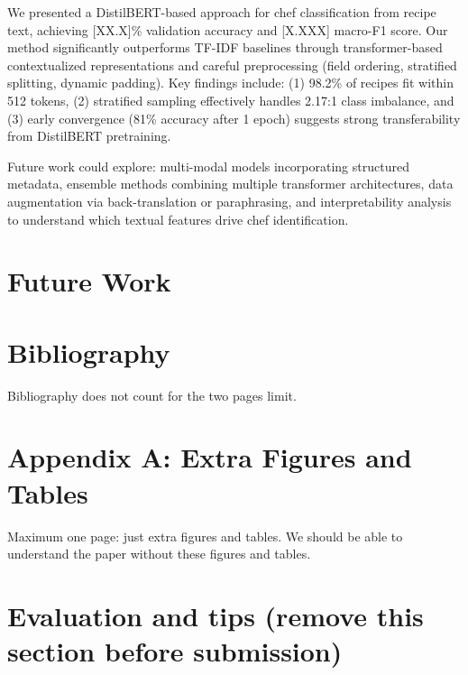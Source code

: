 \documentclass[twocolumn,10pt]{article}
\begin{document}
We presented a DistilBERT-based approach for chef classification from recipe text, achieving [XX.X]\% validation accuracy and [X.XXX] macro-F1 score. Our method significantly outperforms TF-IDF baselines through transformer-based contextualized representations and careful preprocessing (field ordering, stratified splitting, dynamic padding). Key findings include: (1) 98.2\% of recipes fit within 512 tokens, (2) stratified sampling effectively handles 2.17:1 class imbalance, and (3) early convergence (81\% accuracy after 1 epoch) suggests strong transferability from DistilBERT pretraining.

Future work could explore: multi-modal models incorporating structured metadata, ensemble methods combining multiple transformer architectures, data augmentation via back-translation or paraphrasing, and interpretability analysis to understand which textual features drive chef identification.

\section{Future Work}

\section*{Bibliography}



Bibliography does not count for the two pages limit.


\appendix

\section*{Appendix A: Extra Figures and Tables}

Maximum one page: just extra figures and tables. We should be able to understand the paper without these figures and tables.

\section{Evaluation and tips (remove this section before submission)}
\end{document}
